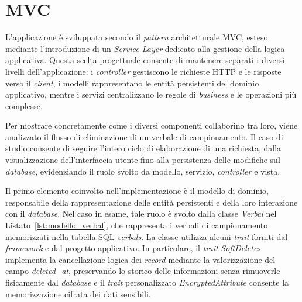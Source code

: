 \section{MVC}
L'applicazione è sviluppata secondo il \textit{pattern} architetturale MVC, esteso mediante l'introduzione di un \textit{Service Layer} dedicato alla gestione della logica applicativa. Questa scelta progettuale consente di mantenere separati i diversi livelli dell'applicazione: i \textit{controller} gestiscono le richieste HTTP e le risposte verso il \textit{client}, i modelli rappresentano le entità persistenti del dominio applicativo, mentre i servizi centralizzano le regole di \textit{business} e le operazioni più complesse.

Per mostrare concretamente come i diversi componenti collaborino tra loro, viene analizzato il flusso di eliminazione di un verbale di campionamento. Il caso di studio consente di seguire l'intero ciclo di elaborazione di una richiesta, dalla visualizzazione dell'interfaccia utente fino alla persistenza delle modifiche sul \textit{database}, evidenziando il ruolo svolto da modello, servizio, \textit{controller} e vista.

Il primo elemento coinvolto nell'implementazione è il modello di dominio, responsabile della rappresentazione delle entità persistenti e della loro interazione con il \textit{database}. Nel caso in esame, tale ruolo è svolto dalla classe \textit{Verbal} nel Listato~\ref{lst:modello_verbal}, che rappresenta i verbali di campionamento memorizzati nella tabella SQL \textit{verbals}. La classe utilizza alcuni \textit{trait} forniti dal \textit{framework} e dal progetto applicativo. In particolare, il \textit{trait} \textit{SoftDeletes} implementa la cancellazione logica dei \textit{record} mediante la valorizzazione del campo \textit{deleted\_at}, preservando lo storico delle informazioni senza rimuoverle fisicamente dal \textit{database} e il \textit{trait} personalizzato \textit{EncryptedAttribute} consente la memorizzazione cifrata dei dati sensibili.

